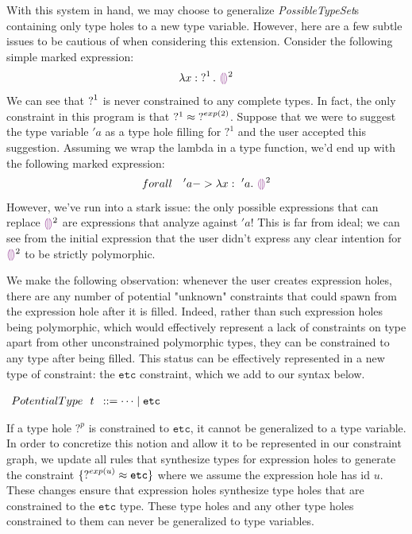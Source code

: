 With this system in hand, we may choose to generalize \emph{PossibleTypeSet}s containing only type holes to a new type variable. However, here are a few subtle issues to be cautious of when considering this extension. Consider the following simple marked expression:
$$\ECLam{x}{\TUnknown^1}{\EEHole^2}$$
We can see that $\operatorname{?}^1$ is never constrained to any complete types. In fact, the only constraint in this program is that $?^1 \approx \mathtt{?}^{exp(2)}$. Suppose that we were to suggest the type variable $'a$ as a type hole filling for $?^1$ and the user accepted this suggestion. Assuming we wrap the lambda in a type function, we'd end up with the following marked expression:
$$forall ~~~'a -> \ECLam{x}{~'a}{\EEHole^2}$$
However, we've run into a stark issue: the only possible expressions that can replace $\EEHole^2$ are expressions that analyze against $'a$! This is far from ideal; we can see from the initial expression that the user didn't express any clear intention for $\EEHole^2$ to be strictly polymorphic.

We make the following observation: whenever the user creates expression holes, there are any number of potential "unknown" constraints that could spawn from the expression hole after it is filled. Indeed, rather than such expression holes being polymorphic, which would effectively represent a lack of constraints on type apart from other unconstrained polymorphic types, they can be constrained to any type after being filled. This status can be effectively represented in a new type of constraint: the $\mathtt{etc}$ constraint, which we add to our syntax below.
\begin{center}
$\arraycolsep=4pt\begin{array}{lll}
PotentialType~~ t & ::= 
  \dots \mid \mathtt{etc}
\end{array}$
\end{center}
If a type hole $?^p$ is constrained to $\mathtt{etc}$, it cannot be generalized to a type variable. In order to concretize this notion and allow it to be represented in our constraint graph, we update all rules that synthesize types for expression holes to generate the constraint $\{ \operatorname{?}^{exp(u)} \approx \mathtt{etc} \}$ where we assume the expression hole has id $u$. These changes ensure that expression holes synthesize type holes that are constrained to the $\mathtt{etc}$ type. These type holes and any other type holes constrained to them can never be generalized to type variables.

